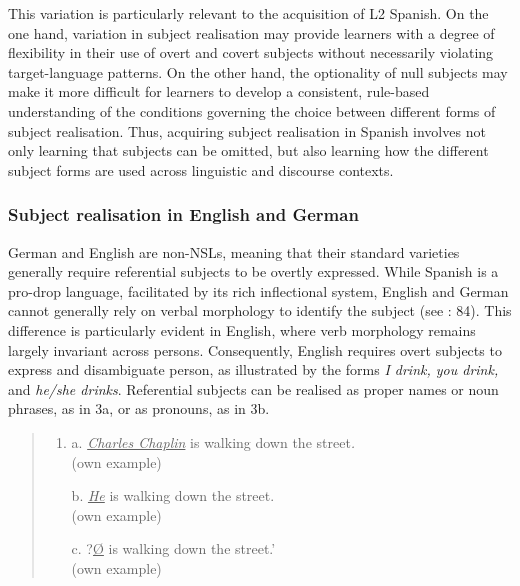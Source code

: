 \documentclass[
  letterpaper,
  DIV=11,
  numbers=noendperiod]{scrartcl}
\begin{document}
This variation is particularly relevant to the acquisition of L2
Spanish. On the one hand, variation in subject realisation may provide
learners with a degree of flexibility in their use of overt and covert
subjects without necessarily violating target-language patterns. On the
other hand, the optionality of null subjects may make it more difficult
for learners to develop a consistent, rule-based understanding of the
conditions governing the choice between different forms of subject
realisation. Thus, acquiring subject realisation in Spanish involves not
only learning that subjects can be omitted, but also learning how the
different subject forms are used across linguistic and discourse
contexts.

\subsubsection{Subject realisation in English and
German}\label{sec-SubjectRealisationGermanEnglish}

German and English are non-NSLs, meaning that their standard varieties
generally require referential subjects to be overtly expressed. While
Spanish is a pro-drop language, facilitated by its rich inflectional
system, English and German cannot generally rely on verbal morphology to
identify the subject (see : 84).
This difference is particularly evident in English, where verb
morphology remains largely invariant across persons. Consequently,
English requires overt subjects to express and disambiguate person, as
illustrated by the forms \emph{I drink, you drink,} and \emph{he/she
drinks}. Referential subjects can be realised as proper names or noun
phrases, as in 3a, or as pronouns, as in 3b.

\begin{quote}
\begin{enumerate}
\def\labelenumi{(\arabic{enumi})}
\setcounter{enumi}{2}
\item
  a. \ul{\emph{Charles Chaplin}} is walking down the street\emph{.}\\
  (own example)

  b. \ul{\emph{He}} is walking down the street.\\
  (own example)

  c. ?\ul{Ø} is walking down the street.'\\
  (own example)
\end{enumerate}
\end{quote}
\end{document}

